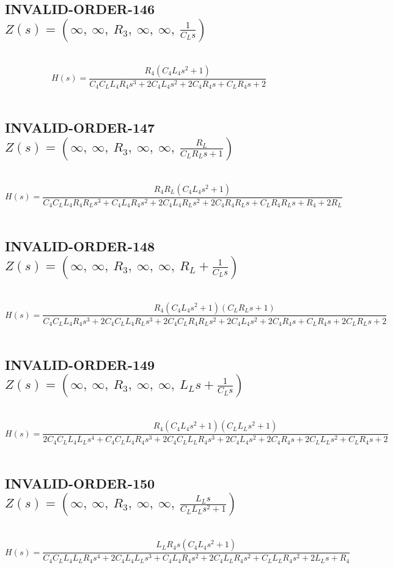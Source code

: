 \documentclass{article}
\begin{document}
\subsection{INVALID-ORDER-146 $Z(s) = \left( \infty, \  \infty, \  R_{3}, \  \infty, \  \infty, \  \frac{1}{C_{L} s}\right)$ } \ 
\textbf{\[H(s) = \frac{R_{4} \left(C_{4} L_{4} s^{2} + 1\right)}{C_{4} C_{L} L_{4} R_{4} s^{3} + 2 C_{4} L_{4} s^{2} + 2 C_{4} R_{4} s + C_{L} R_{4} s + 2}\] } \ 
\subsection{INVALID-ORDER-147 $Z(s) = \left( \infty, \  \infty, \  R_{3}, \  \infty, \  \infty, \  \frac{R_{L}}{C_{L} R_{L} s + 1}\right)$ } \ 
\textbf{\[H(s) = \frac{R_{4} R_{L} \left(C_{4} L_{4} s^{2} + 1\right)}{C_{4} C_{L} L_{4} R_{4} R_{L} s^{3} + C_{4} L_{4} R_{4} s^{2} + 2 C_{4} L_{4} R_{L} s^{2} + 2 C_{4} R_{4} R_{L} s + C_{L} R_{4} R_{L} s + R_{4} + 2 R_{L}}\] } \ 
\subsection{INVALID-ORDER-148 $Z(s) = \left( \infty, \  \infty, \  R_{3}, \  \infty, \  \infty, \  R_{L} + \frac{1}{C_{L} s}\right)$ } \ 
\textbf{\[H(s) = \frac{R_{4} \left(C_{4} L_{4} s^{2} + 1\right) \left(C_{L} R_{L} s + 1\right)}{C_{4} C_{L} L_{4} R_{4} s^{3} + 2 C_{4} C_{L} L_{4} R_{L} s^{3} + 2 C_{4} C_{L} R_{4} R_{L} s^{2} + 2 C_{4} L_{4} s^{2} + 2 C_{4} R_{4} s + C_{L} R_{4} s + 2 C_{L} R_{L} s + 2}\] } \ 
\subsection{INVALID-ORDER-149 $Z(s) = \left( \infty, \  \infty, \  R_{3}, \  \infty, \  \infty, \  L_{L} s + \frac{1}{C_{L} s}\right)$ } \ 
\textbf{\[H(s) = \frac{R_{4} \left(C_{4} L_{4} s^{2} + 1\right) \left(C_{L} L_{L} s^{2} + 1\right)}{2 C_{4} C_{L} L_{4} L_{L} s^{4} + C_{4} C_{L} L_{4} R_{4} s^{3} + 2 C_{4} C_{L} L_{L} R_{4} s^{3} + 2 C_{4} L_{4} s^{2} + 2 C_{4} R_{4} s + 2 C_{L} L_{L} s^{2} + C_{L} R_{4} s + 2}\] } \ 
\subsection{INVALID-ORDER-150 $Z(s) = \left( \infty, \  \infty, \  R_{3}, \  \infty, \  \infty, \  \frac{L_{L} s}{C_{L} L_{L} s^{2} + 1}\right)$ } \ 
\textbf{\[H(s) = \frac{L_{L} R_{4} s \left(C_{4} L_{4} s^{2} + 1\right)}{C_{4} C_{L} L_{4} L_{L} R_{4} s^{4} + 2 C_{4} L_{4} L_{L} s^{3} + C_{4} L_{4} R_{4} s^{2} + 2 C_{4} L_{L} R_{4} s^{2} + C_{L} L_{L} R_{4} s^{2} + 2 L_{L} s + R_{4}}\] } \ 
\end{document}
